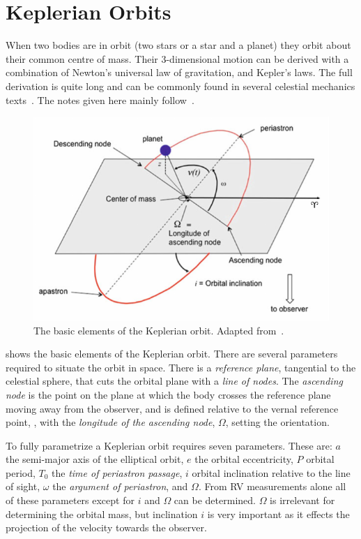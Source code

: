 
\section{Keplerian Orbits}

When two bodies are in orbit (two stars or a star and a planet) they orbit about their common centre of mass.
Their 3-dimensional motion can be derived with a combination of Newton's universal law of gravitation, and Kepler's laws.
The full derivation is quite long and can be commonly found in several celestial mechanics texts~\citep[e.g.][]{moulton_introduction_1914, perryman_exoplanet_2011, fitzpatrick_introduction_2012}.
The notes given here mainly follow~\citep{bozza_methods_2016}.

\begin{figure}
    \centering
    \includegraphics[width=0.6\linewidth]{figures/fundamental_rv/orbit_diagram2.pdf}
    \caption{The basic elements of the Keplerian orbit. Adapted from~\citep{bozza_methods_2016}.}
    \label{fig:orbitdiagram}
\end{figure}

 shows the basic elements of the Keplerian orbit.
There are several parameters required to situate the orbit in space.
There is a \textit{reference plane}, tangential to the celestial sphere, that cuts the orbital plane with a \textit{line of nodes}.
The \textit{ascending node} is the point on the plane at which the body crosses the reference plane moving away from the observer, and is defined relative to the vernal reference point, \Aries, with the \textit{longitude of the ascending node}, $\Omega$, setting the orientation.

To fully parametrize a Keplerian orbit requires seven parameters.
These are: $a$ the semi-major axis of the elliptical orbit, $e$ the orbital eccentricity, $P$ orbital period, $T_0$ the \emph{time of periastron passage}, $i$ orbital inclination relative to the line of sight, $\omega$ the \emph{argument of periastron}, and $\Omega$.
From RV measurements alone all of these parameters except for $i$ and $\Omega$ can be determined.
$\Omega$ is irrelevant for determining the orbital mass, but inclination $i$ is very important as it effects the projection of the velocity towards the observer.


